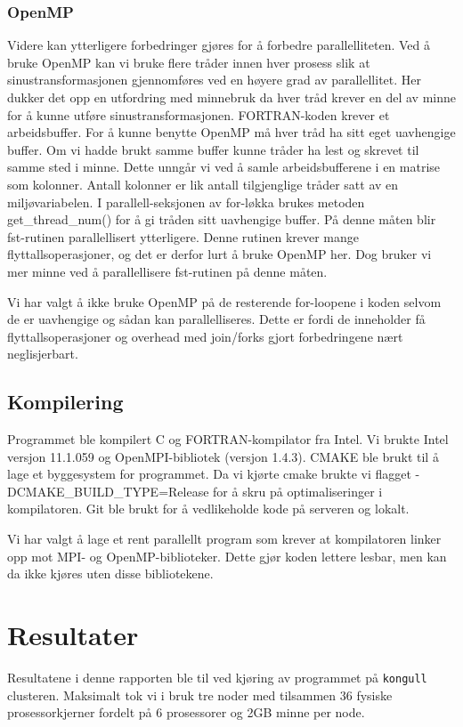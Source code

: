 \documentclass[11pt,norsk,a4paper]{article}
\begin{document}
\subsubsection{OpenMP}
Videre kan ytterligere forbedringer gjøres for å forbedre parallelliteten. Ved å bruke OpenMP\cite{MP} kan vi bruke flere tråder innen hver prosess slik at sinustransformasjonen gjennomføres ved en høyere grad av parallellitet. Her dukker det opp en utfordring med minnebruk da hver tråd krever en del av minne for å kunne utføre sinustransformasjonen. FORTRAN-koden krever et arbeidsbuffer. For å kunne benytte OpenMP må hver tråd ha sitt eget uavhengige buffer. Om vi hadde brukt samme buffer kunne tråder ha lest og skrevet til samme sted i minne. Dette unngår vi ved å samle arbeidsbufferene i en matrise som kolonner. Antall kolonner er lik antall tilgjenglige tråder satt av en miljøvariabelen. I parallell-seksjonen av for-løkka brukes metoden get\_thread\_num() for å gi tråden sitt uavhengige buffer. På denne måten blir fst-rutinen parallellisert ytterligere. Denne rutinen krever mange flyttallsoperasjoner, og det er derfor lurt å bruke OpenMP her. Dog bruker vi mer minne ved å parallellisere fst-rutinen på denne måten.

Vi har valgt å ikke bruke OpenMP på de resterende for-loopene i koden selvom de er uavhengige og sådan kan parallelliseres. Dette er fordi de inneholder få flyttallsoperasjoner og overhead med join/forks gjort forbedringene nært neglisjerbart.

\subsection{Kompilering}
Programmet ble kompilert C og FORTRAN-kompilator fra Intel. Vi brukte Intel versjon 11.1.059 og OpenMPI-bibliotek (versjon 1.4.3). CMAKE ble brukt til å lage et byggesystem for programmet. Da vi kjørte cmake brukte vi flagget -DCMAKE\_BUILD\_TYPE=Release for å skru på optimaliseringer i kompilatoren. Git\cite{git} ble brukt for å vedlikeholde kode på serveren og lokalt.

Vi har valgt å lage et rent parallellt program som krever at kompilatoren linker opp mot MPI- og OpenMP-biblioteker. Dette gjør koden lettere lesbar, men kan da ikke kjøres uten disse bibliotekene.

\section{Resultater}
Resultatene i denne rapporten ble til ved kjøring av programmet på \texttt{kongull} clusteren\cite{kongull}. Maksimalt tok vi i bruk tre noder med tilsammen 36 fysiske prosessorkjerner fordelt på 6 prosessorer og 2GB minne per node.
\end{document}
